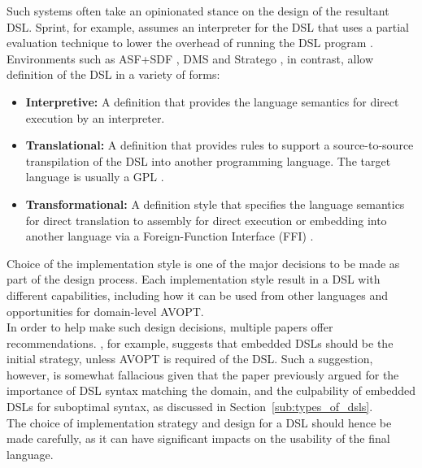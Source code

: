 Such systems often take an opinionated stance on the design of the resultant DSL. 
Sprint, for example, assumes an interpreter for the DSL that uses a partial evaluation technique to lower the overhead of running the DSL program \citep{Consel98architecturingsoftware}.
Environments such as ASF+SDF \citep{van2001asf+}, DMS \citep{baxter2004dms} and Stratego \citep{visser2003stratego}, in contrast, allow definition of the DSL in a variety of forms:
\begin{itemize}
    \item \textbf{Interpretive:} A definition that provides the language semantics for direct execution by an interpreter.
    \item \textbf{Translational:} A definition that provides rules to support a source-to-source transpilation of the DSL into another programming language.
    The target language is usually a GPL \citep{Mernik:2005:DDL:1118890.1118892}.
    \item \textbf{Transformational:} A definition style that specifies the language semantics for direct translation to assembly for direct execution or embedding into another language via a Foreign-Function Interface (FFI) \citep{van2001asf+}.
\end{itemize}

Choice of the implementation style is one of the major decisions to be made as part of the design process.
Each implementation style result in a DSL with different capabilities, including how it can be used from other languages and opportunities for domain-level AVOPT. \\

In order to help make such design decisions, multiple papers offer recommendations.
\citet{Mernik:2005:DDL:1118890.1118892}, for example, suggests that embedded DSLs should be the initial strategy, unless AVOPT is required of the DSL.
Such a suggestion, however, is somewhat fallacious given that the paper previously argued for the importance of DSL syntax matching the domain, and the culpability of embedded DSLs for suboptimal syntax, as discussed in Section~\ref{sub:types_of_dsls}. \\

The choice of implementation strategy and design for a DSL should hence be made carefully, as it can have significant impacts on the usability of the final language. 



